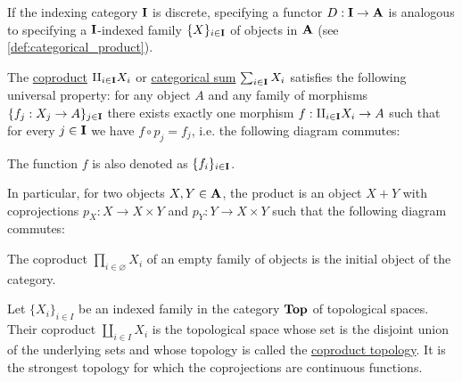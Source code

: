 \begin{definition}\label{def:categorical_sum}\cite[definition 5.2.2]{Leinster2014}
  If the indexing category $\operatorname{\mathbf{I}}$ is discrete, specifying a functor $D: \operatorname{\mathbf{I}} \to \operatorname{\mathbf{A}}$ is analogous to specifying a $\operatorname{\mathbf{I}}$-indexed family $\{ X \}_{i \in \operatorname{\mathbf{I}}}$ of objects in $\operatorname{\mathbf{A}}$ (see \cref{def:categorical_product}).

  The \uline{coproduct} $\amalg_{i \in \operatorname{\mathbf{I}}} X_i$ or \uline{categorical sum} $\sum_{i \in \operatorname{\mathbf{I}}} X_i$ satisfies the following universal property: for any object $A$ and any family of morphisms $\{ f_j: {X_j} \to A \}_{j \in \operatorname{\mathbf{I}}}$ there exists exactly one morphism $f: \amalg_{i \in \operatorname{\mathbf{I}}} X_i \to A$ such that for every $j \in \operatorname{\mathbf{I}}$ we have $f \circ p_j = f_j$, i.e. the following diagram commutes:
  \begin{center}
  \end{center}

  The function $f$ is also denoted as $\{ f_i \}_{i \in \operatorname{\mathbf{I}}}$.

  In particular, for two objects $X, Y \in \operatorname{\mathbf{A}}$, the product is an object $X + Y$ with coprojections $p_X: X \to X \times Y$ and $p_Y: Y \to X \times Y$ such that the following diagram commutes:
  \begin{center}
  \end{center}
\end{definition}

\begin{note}\label{note:categorical_coproduct_of_empty_family}
  The coproduct $\prod_{i \in \varnothing} X_i$ of an empty family of objects is the initial object of the category.
\end{note}

\begin{example}\label{ex:categorical_coproduct/top}
  Let $\{ X_i \}_{i \in I}$ be an indexed family in the category $\operatorname{\mathbf{Top}}$ of topological spaces. Their coproduct $\amalg_{i \in I} X_i$ is the topological space whose set is the disjoint union of the underlying sets and whose topology is called the \uline{coproduct topology}. It is the strongest topology for which the coprojections are continuous functions.
\end{example}

